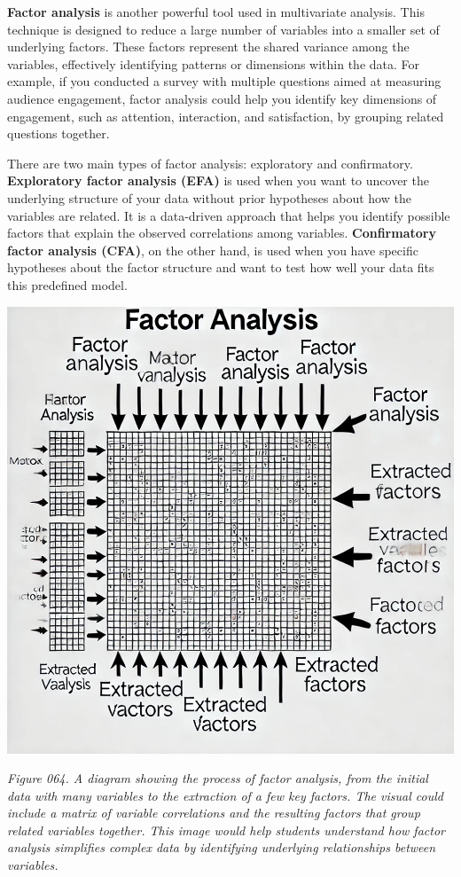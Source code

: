 \documentclass[
]{book}
\begin{document}
\textbf{Factor analysis} is another powerful tool used in multivariate analysis. This technique is designed to reduce a large number of variables into a smaller set of underlying factors. These factors represent the shared variance among the variables, effectively identifying patterns or dimensions within the data. For example, if you conducted a survey with multiple questions aimed at measuring audience engagement, factor analysis could help you identify key dimensions of engagement, such as attention, interaction, and satisfaction, by grouping related questions together.

There are two main types of factor analysis: exploratory and confirmatory. \textbf{Exploratory factor analysis (EFA)} is used when you want to uncover the underlying structure of your data without prior hypotheses about how the variables are related. It is a data-driven approach that helps you identify possible factors that explain the observed correlations among variables. \textbf{Confirmatory factor analysis (CFA)}, on the other hand, is used when you have specific hypotheses about the factor structure and want to test how well your data fits this predefined model.

\includegraphics[width=1\textwidth,height=\textheight]{images/fig064.jpg}

\emph{Figure 064. A diagram showing the process of factor analysis, from the initial data with many variables to the extraction of a few key factors. The visual could include a matrix of variable correlations and the resulting factors that group related variables together. This image would help students understand how factor analysis simplifies complex data by identifying underlying relationships between variables.}
\end{document}
